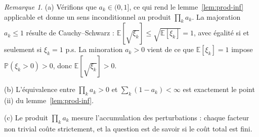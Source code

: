 \documentclass[11pt,a4paper]{article}
\theoremstyle{plain}
\theoremstyle{definition}
\theoremstyle{remark}
\newtheorem{remark}[theorem]{Remarque}
\newcommand{\E}{\mathbb{E}}
\newcommand{\Prob}{\mathbb{P}}
\begin{document}
\begin{remark}
(a) Vérifions que $a_k \in (0,1]$, ce qui rend le lemme~\ref{lem:prod-inf}
applicable et donne un sens inconditionnel au produit $\prod_k a_k$.
La majoration $a_k \le 1$ résulte de Cauchy--Schwarz :
$\E[\sqrt{\xi_k}] \le \sqrt{\E[\xi_k]} = 1$, avec égalité si et seulement si
$\xi_k = 1$ p.s. La minoration $a_k > 0$ vient de ce que $\E[\xi_k] = 1$
impose $\Prob(\xi_k > 0) > 0$, donc $\E[\sqrt{\xi_k}] > 0$.

(b) L'équivalence entre $\prod_k a_k > 0$ et $\sum_k (1 - a_k) < \infty$ est
exactement le point (ii) du lemme~\ref{lem:prod-inf}.

(c) Le produit $\prod_k a_k$ mesure l'accumulation des perturbations : chaque
facteur non trivial coûte strictement, et la question est de savoir si le coût
total est fini.
\end{remark}
\end{document}
